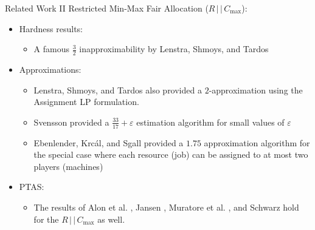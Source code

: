 \documentclass[10pt]{beamer}
\begin{document}
\begin{frame}{Related Work II}
	Restricted Min-Max Fair Allocation ($R \, | \, | \, C_{\max}$):
    \begin{itemize}
    	\item<2-> Hardness results:
        \begin{itemize}
        	\item<3-> A famous $\frac{3}{2}$ inapproximability by Lenstra, Shmoys, and Tardos \cite{LST90}
        \end{itemize}
        \item<4-> Approximations:
        \begin{itemize}
        	\item<5-> Lenstra, Shmoys, and Tardos also provided a $2$-approximation using the \alert{Assignment LP} formulation.
            \item<6-> Svensson provided a \alert{$\frac{33}{17} + \varepsilon$ estimation} algorithm for small values of $\varepsilon$ \cite{Svensson11}
            \item<7-> Ebenlender, Krc\'{a}l, and Sgall \cite{EKS08} provided a \alert{$1.75$} approximation algorithm for the special case where each resource (job) can be assigned to at most two players (machines)
        \end{itemize}
        \item<8-> PTAS:
        \begin{itemize}
            \item The results of Alon et al. \cite{AAWY98}, Jansen \cite{Jansen10}, Muratore et al. \cite{MSW10}, and Schwarz \cite{Schwarz10} hold for the $R \, | \, | \, C_{\max}$ as well.
        \end{itemize}
    \end{itemize}
\end{frame}

\end{document}

